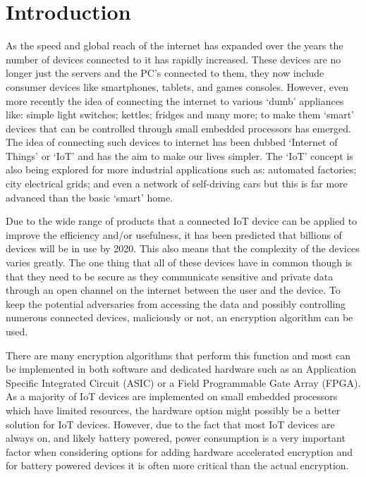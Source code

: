 \documentclass[12pt,twoside,a4paper]{report}
\begin{document}
	\chapter{Introduction}
	\label{chapter:intro}
	As the speed and global reach of the internet has expanded over the years the number of devices connected to it has rapidly increased. These devices are no longer just the servers and the PC's connected to them, they now include consumer devices like smartphones, tablets, and games consoles. However, even more recently the idea of connecting the internet to various `dumb' appliances like: simple light switches; kettles; fridges and many more; to make them `smart' devices that can be controlled through small embedded processors has emerged. The idea of connecting such devices to internet has been dubbed `Internet of Things' or `IoT' and has the aim to make our lives simpler. The `IoT' concept is also being explored for more industrial applications such as: automated factories; city electrical grids; and even a network of self-driving cars\cite{Hegde} but this is far more advanced than the basic `smart' home.
    
	Due to the wide range of products that a connected IoT device can be applied to improve the efficiency and/or usefulness, it has been predicted that billions of devices will be in use by 2020\cite{Evans2011}. This also means that the complexity of the devices varies greatly. The one thing that all of these devices have in common though is that they need to be secure as they communicate sensitive and private data through an open channel on the internet between the user and the device. To keep the potential adversaries from accessing the data and possibly controlling numerous connected devices, maliciously or not, an encryption algorithm can be used.  
        
	There are many encryption algorithms that perform this function and most can be implemented in both software and dedicated hardware such as an Application Specific Integrated Circuit (ASIC) or a Field Programmable Gate Array (FPGA). As a majority of IoT devices are implemented on small embedded processors which have limited resources, the hardware option might possibly be a better solution for IoT devices. However, due to the fact that most IoT devices are always on, and likely battery powered, power consumption is a very important factor when considering options for adding hardware accelerated encryption and for battery powered devices it is often more critical than the actual encryption.
    
\end{document}
